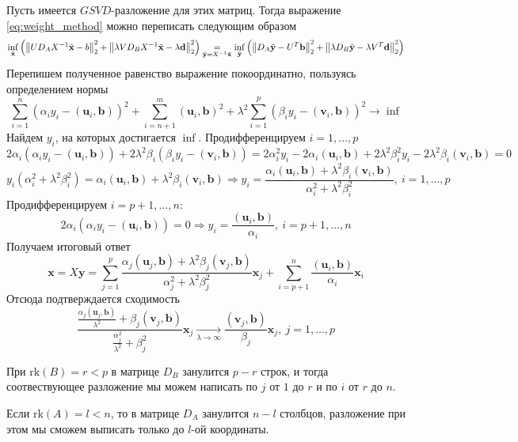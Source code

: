 Пусть имеется $GSVD$-разложение для этих матриц. Тогда выражение \eqref{eq:weight_method}
можно переписать следующим образом
\[\inf_{\tilde{\mathbf{x}}}\left(\left\lVert UD_AX^{-1}\tilde{\mathbf{x}}-b\right\rVert^2_2+\left\lVert\lambda VD_BX^{-1}\tilde{\mathbf{x}}-\lambda\mathbf{d}\right\rVert^2_2\right)\underset{\tilde{\mathbf{y}}=X^{-1}\tilde{\mathbf{x}}}{=}\inf_{\tilde{\mathbf{y}}}\left(\left\lVert D_A\tilde{\mathbf{y}}-U^T\mathbf{b}\right\rVert^2_2+\left\lVert\lambda D_B\tilde{\mathbf{y}}-\lambda V^T\mathbf{d}\right\rVert^2_2\right)\]
Перепишем полученное равенство выражение покоординатно, пользуясь определением нормы
\[\sum_{i=1}^{n}(\alpha_iy_i-(\mathbf{u}_i, \mathbf{b}))^2+\sum_{i=n+1}^{m}(\mathbf{u}_i,\mathbf{b})^2+\lambda^2\sum_{i=1}^p(\beta_iy_i-(\mathbf{v}_i,\mathbf{b}))^2\rightarrow\inf\]
Найдем $y_i$, на которых достигается $\inf$. Продифференцируем $i=1,\ldots,p$
\[2\alpha_i(\alpha_iy_i-(\mathbf{u}_i, \mathbf{b}))+2\lambda^2\beta_i(\beta_iy_i-(\mathbf{v}_i,\mathbf{b}))=2\alpha_i^2y_i-2\alpha_i(\mathbf{u}_i, \mathbf{b})+2\lambda^2\beta_i^2y_i-2\lambda^2\beta_i(\mathbf{v}_i,\mathbf{b})=0\]
\[y_i(\alpha_i^2+\lambda^2\beta^2_i)=\alpha_i(\mathbf{u}_i, \mathbf{b})+\lambda^2\beta_i(\mathbf{v}_i,\mathbf{b})\Rightarrow y_i=\frac{\alpha_i(\mathbf{u}_i, \mathbf{b})+\lambda^2\beta_i(\mathbf{v}_i,\mathbf{b})}{\alpha_i^2+\lambda^2\beta^2_i},\ i=1,\ldots,p\]
Продифференцируем $i=p+1,\ldots,n$:
\[2\alpha_i(\alpha_iy_i-(\mathbf{u}_i, \mathbf{b}))=0\Rightarrow y_i=\frac{(\mathbf{u}_i, \mathbf{b})}{\alpha_i},\ i=p+1,\ldots,n\]
Получаем итоговый ответ
\[\mathbf{x}=X\mathbf{y}=\sum_{j=1}^p\frac{\alpha_j(\mathbf{u}_j, \mathbf{b})+\lambda^2\beta_j(\mathbf{v}_j,\mathbf{b})}{\alpha_j^2+\lambda^2\beta^2_j}\mathbf{x}_j+\sum_{i=p+1}^n\frac{(\mathbf{u}_i, \mathbf{b})}{\alpha_i}\mathbf{x}_i\]
Отсюда подтверждается сходимость
\[\frac{\frac{\alpha_j(\mathbf{u}_j, \mathbf{b})}{\lambda^2}+\beta_j(\mathbf{v}_j,\mathbf{b})}{\frac{\alpha_j^2}{\lambda^2}+\beta^2_j}\mathbf{x}_j\underset{\lambda\rightarrow\infty}{\rightarrow}\frac{(\mathbf{v}_j,\mathbf{b})}{\beta_j}\mathbf{x}_j,\ j=1,\ldots,p\]
\begin{remark}
  При $\text{rk}(B)=r<p$ в матрице $D_B$ занулится $p-r$ строк, и
  тогда соотвествующее разложение мы можем написать по $j$ от $1$ до $r$
  и по $i$ от $r$ до $n$.

  Если $\text{rk}(A)=l<n$, то в матрице $D_A$ занулится $n-l$ столбцов,
  разложение при этом мы сможем выписать только до $l$-ой координаты.
\end{remark}
